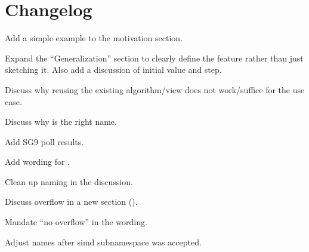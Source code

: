 \section{Changelog}
\begin{revision}
\item Add a simple example to the motivation section.
\item Expand the “Generalization” section to clearly define the feature rather
  than just sketching it.
  Also add a discussion of initial value and step.
\item Discuss why reusing the existing  algorithm/view does not
  work/suffice for the  use case.
\item Discuss why  is the right name.
\end{revision}

\begin{revision}
\item Add SG9 poll results.
\item Add wording for .
\end{revision}

\begin{revision}
\item Clean up naming in the discussion.
\item Discuss overflow in a new section ().
\item Mandate “no overflow” in the wording.
\end{revision}

\begin{revision}
\item Adjust names after simd subnamespace was accepted.
\end{revision}
